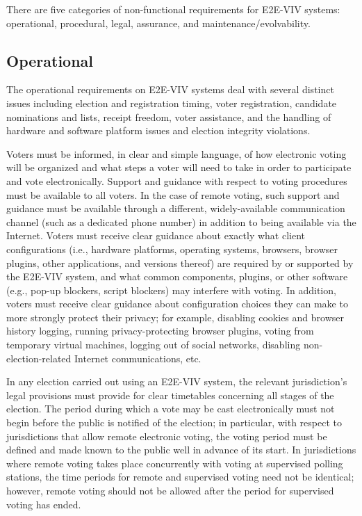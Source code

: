 There are five categories of non-functional requirements for E2E-VIV
systems: operational, procedural, legal, assurance, and
maintenance/evolvability.

\subsection{Operational}
\label{req:operational}

The operational requirements on E2E-VIV systems deal with several
distinct issues including election and registration timing, voter
registration, candidate nominations and lists, receipt freedom, voter
assistance, and the handling of hardware and software platform issues
and election integrity violations.

Voters must be informed, in clear and simple language, of how
electronic voting will be organized and what steps a voter will need
to take in order to participate and vote electronically. Support and
guidance with respect to voting procedures must be available to all
voters. In the case of remote voting, such support and guidance must
be available through a different, widely-available communication
channel (such as a dedicated phone number) in addition to being
available via the Internet. Voters must receive clear guidance about
exactly what client configurations (i.e., hardware platforms,
operating systems, browsers, browser plugins, other applications, and
versions thereof) are required by or supported by the E2E-VIV system,
and what common components, plugins, or other software (e.g., pop-up
blockers, script blockers) may interfere with voting. In addition,
voters must receive clear guidance about configuration choices they
can make to more strongly protect their privacy; for example,
disabling cookies and browser history logging, running
privacy-protecting browser plugins, voting from temporary virtual
machines, logging out of social networks, disabling
non-election-related Internet communications, etc.

In any election carried out using an E2E-VIV system, the relevant
jurisdiction's legal provisions must provide for clear timetables
concerning all stages of the election. The period during which a vote
may be cast electronically must not begin before the public is
notified of the election; in particular, with respect to jurisdictions
that allow remote electronic voting, the voting period must be defined
and made known to the public well in advance of its start. In
jurisdictions where remote voting takes place concurrently with voting
at supervised polling stations, the time periods for remote and
supervised voting need not be identical; however, remote voting should
not be allowed after the period for supervised voting has ended.

